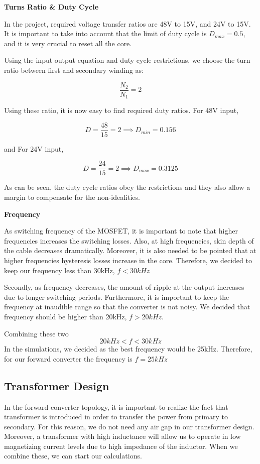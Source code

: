 \textbf{Turns Ratio \& Duty Cycle}

In the project, required voltage transfer ratios are 48V to 15V, and 24V to 15V. It is important to take into account that the limit of duty cycle is $D_{max} = 0.5$, and it is very crucial to reset all the core.

Using the input output equation and duty cycle restrictions, we choose the turn ratio between first and secondary winding as:

$$\frac{N_2}{N_1} = 2$$


Using these ratio, it is now easy to find required duty ratios. For 48V input,

$$D = \frac{48}{15} = 2 \implies D_{min} = 0.156$$

and For 24V input,

$$D = \frac{24}{15} = 2 \implies D_{max} = 0.3125$$

As can be seen, the duty cycle ratios obey the restrictions and they also allow a margin to compensate for the non-idealities.

\textbf{Frequency}

As switching frequency of the MOSFET, it is important to note that higher frequencies increases the switching losses. Also, at high frequencies, skin depth of the cable decreases dramatically. Moreover, it is also needed to be pointed that at higher frequencies hysteresis losses increase in the core. Therefore, we decided to keep our frequency less than 30kHz, $f < 30kHz$

Secondly, as frequency decreases, the amount of ripple at the output increases due to longer switching periods. Furthermore, it is important to keep the frequency at inaudible range so that the converter is not noisy. We decided that frequency should be higher than 20kHz, $f > 20kHz$.

Combining these two
$$20 kHz < f < 30kHz$$
In the simulations, we decided as the best frequency would be 25kHz. Therefore, for our forward converter the frequency is $f = 25kHz$


\subsection{Transformer Design}
In the forward converter topology, it is important to realize the fact that transformer is introduced in order to transfer the power from primary to secondary. For this reason, we do not need any air gap in our transformer design. Moreover, a transformer with high inductance will allow us to operate in low magnetizing current levels due to high impedance of the inductor. When we combine these, we can start our calculations.

